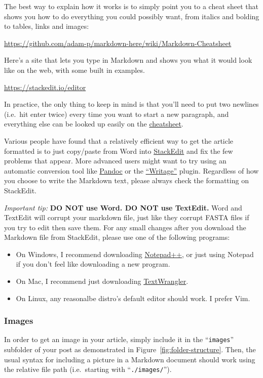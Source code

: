 \documentclass[paper=a4, fontsize=11pt]{scrartcl}
\numberwithin{equation}{section}        %
\numberwithin{figure}{section}            %
\numberwithin{table}{section}                %
\begin{document}
The best way to explain how it works is to simply point you to a cheat
sheet that shows you how to do everything you could possibly want,
from italics and bolding to tables, links and images:

\url{https://github.com/adam-p/markdown-here/wiki/Markdown-Cheatsheet}

Here's a site that lets you type in Markdown and shows you what it would
look like on the web, with some built in examples.

\url{https://stackedit.io/editor}

In practice, the only thing to keep in mind is that you'll need to put
two newlines (i.e.\ hit enter twice) every time you want to start a new
paragraph, and everything else can be looked up easily on the
\href{https://github.com/adam-p/markdown-here/wiki/Markdown-Cheatsheet}{cheatsheet}.

Various people have found
that a relatively efficient way to get the article formatted is to just copy/paste
from Word into \href{https://stackedit.io/editor}{StackEdit} and fix the few problems that appear. More advanced users
might want to try using an automatic conversion tool like
\href{http://pandoc.org/demos.html}{Pandoc} or the
\href{http://www.writage.com/}{``Writage''} plugin. Regardless of how you choose
to write the Markdown text, please always check the formatting on StackEdit.

\textit{Important tip:} \textbf{DO NOT use Word. DO NOT use TextEdit.}
Word and TextEdit will corrupt your markdown file, just like they corrupt FASTA
files if you try to edit then save them. For any small changes after you
download the Markdown file from StackEdit, please use one of the following
programs:
\begin{itemize}
    \item On Windows, I
recommend downloading \href{https://notepad-plus-plus.org/}{Notepad++},
or just using Notepad if you don't feel like downloading a new program.
    \item On Mac, I recommend just downloading
\href{https://itunes.apple.com/us/app/textwrangler/id404010395?mt=12}{TextWrangler}.
    \item On Linux, any reasonalbe distro's default editor should work. I prefer
Vim.
\end{itemize}

\subsubsection{Images}\label{sec:image-links}
In order to get an image in your article, simply include it in the
``\texttt{images}'' subfolder of your post as demonstrated in
Figure~\ref{fig:folder-structure}. Then, the usual syntax for including a
picture in a Markdown document should work using the relative file path
(i.e.\ starting with ``\texttt{./images/}'').
\end{document}
